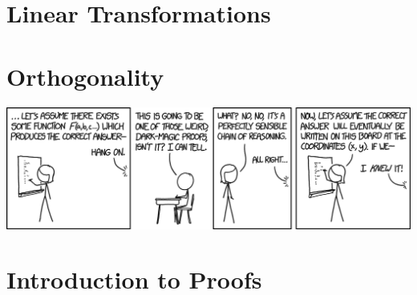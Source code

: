 \documentclass[oneside]{book}
\begin{document}
\chapter{Linear Transformations}

    

\begin{savequote}

\end{savequote}
\chapter{Orthogonality}

    

\appendix
\appendixpage
\noappendicestocpagenum
\addappheadtotoc
\begin{savequote}
    \includegraphics[scale=0.5]{Graphics/proofxkcd.png}
    \end{savequote}
\chapter{Introduction to Proofs}

    
        
\end{document}
